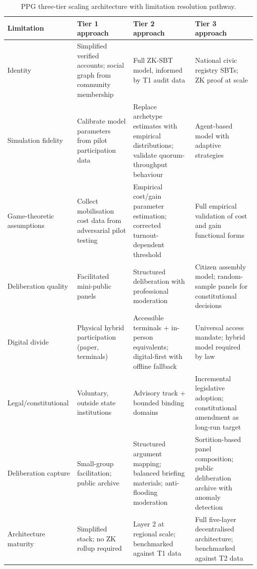 \documentclass[12pt,a4paper,oneside]{report}
\begin{document}
\begin{table}[htbp]
\centering
\caption{PPG three-tier scaling architecture with limitation resolution pathway.}
\begin{tabular}{@{} p{2.2cm} p{3.4cm} p{3.4cm} p{3.4cm} @{}}
\toprule
\textbf{Limitation} & \textbf{Tier 1 approach} & \textbf{Tier 2 approach} & \textbf{Tier 3 approach} \\
\midrule
Identity & Simplified verified accounts; social graph from community membership & Full ZK-SBT model, informed by T1 audit data & National civic registry SBTs; ZK proof at scale \\
Simulation fidelity & Calibrate model parameters from pilot participation data & Replace archetype estimates with empirical distributions; validate quorum-throughput behaviour & Agent-based model with adaptive strategies \\
Game-theoretic assumptions & Collect mobilisation cost data from adversarial pilot testing & Empirical cost/gain parameter estimation; corrected turnout-dependent threshold & Full empirical validation of cost and gain functional forms \\
Deliberation quality & Facilitated mini-public panels & Structured deliberation with professional moderation & Citizen assembly model; random-sample panels for constitutional decisions \\
Digital divide & Physical hybrid participation (paper, terminals) & Accessible terminals + in-person equivalents; digital-first with offline fallback & Universal access mandate; hybrid model required by law \\
Legal/constitutional & Voluntary, outside state institutions & Advisory track + bounded binding domains & Incremental legislative adoption; constitutional amendment as long-run target \\
Deliberation capture & Small-group facilitation; public archive & Structured argument mapping; balanced briefing materials; anti-flooding moderation & Sortition-based panel composition; public deliberation archive with anomaly detection \\
Architecture maturity & Simplified stack; no ZK rollup required & Layer 2 at regional scale; benchmarked against T1 data & Full five-layer decentralised architecture; benchmarked against T2 data \\
\bottomrule
\end{tabular}
\label{tab:scaling}
\end{table}

\end{document}
